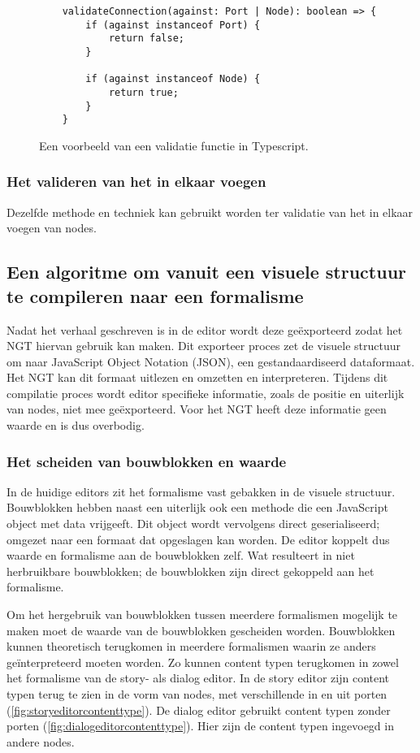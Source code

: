 \begin{figure}[htb]
    \centering
    \lstset{language=JavaScript}
    \begin{lstlisting}
    validateConnection(against: Port | Node): boolean => {
        if (against instanceof Port) {
            return false;
        }

        if (against instanceof Node) {
            return true;
        }
    }
    \end{lstlisting}
    \caption{Een voorbeeld van een validatie functie in Typescript.}
    \label{fig:validationfunction}
\end{figure}

\subsubsection{Het valideren van het in elkaar voegen}
Dezelfde methode en techniek kan gebruikt worden ter validatie van het in elkaar voegen van nodes.

\subsection{Een algoritme om vanuit een visuele structuur te compileren naar een formalisme}
Nadat het verhaal geschreven is in de editor wordt deze geëxporteerd zodat het NGT hiervan gebruik kan maken. Dit exporteer proces zet de visuele structuur om naar JavaScript Object Notation (JSON), een gestandaardiseerd dataformaat. Het NGT kan dit formaat uitlezen en omzetten en interpreteren. Tijdens dit compilatie proces wordt editor specifieke informatie, zoals de positie en uiterlijk van nodes, niet mee geëxporteerd. Voor het NGT heeft deze informatie geen waarde en is dus overbodig.

\subsubsection{Het scheiden van bouwblokken en waarde}
In de huidige editors zit het formalisme vast gebakken in de visuele structuur. Bouwblokken hebben naast een uiterlijk ook een methode die een JavaScript object met data vrijgeeft. Dit object wordt vervolgens direct geserialiseerd; omgezet naar een formaat dat opgeslagen kan worden. De editor koppelt dus waarde en formalisme aan de bouwblokken zelf. Wat resulteert in niet herbruikbare bouwblokken; de bouwblokken zijn direct gekoppeld aan het formalisme.

Om het hergebruik van bouwblokken tussen meerdere formalismen mogelijk te maken moet de waarde van de bouwblokken gescheiden worden. Bouwblokken kunnen theoretisch terugkomen in meerdere formalismen waarin ze anders geïnterpreteerd moeten worden. Zo kunnen content typen terugkomen in zowel het formalisme van de story- als dialog editor. In de story editor zijn content typen terug te zien in de vorm van nodes, met verschillende in en uit porten (\autoref{fig:storyeditorcontenttype}). De dialog editor gebruikt content typen zonder porten (\autoref{fig:dialogeditorcontenttype}). Hier zijn de content typen ingevoegd in andere nodes.

